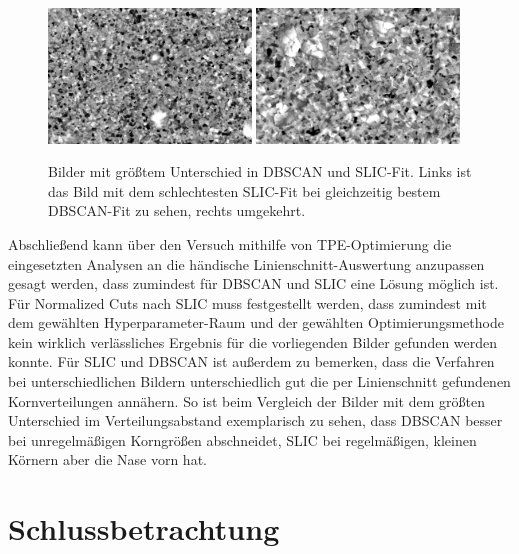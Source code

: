 \documentclass[
  12pt,
  openany]{book}
\begin{document}
\begin{figure}

{\centering \includegraphics[width=0.48\textwidth]{../imgs/slic_dbscan_0} \includegraphics[width=0.48\textwidth]{../imgs/slic_dbscan_1} 

}

\caption[Bilder mit größtem Unterschied in DBSCAN und SLIC-Fit.]{Bilder mit größtem Unterschied in DBSCAN und SLIC-Fit. Links ist das Bild mit dem schlechtesten SLIC-Fit bei gleichzeitig bestem DBSCAN-Fit zu sehen, rechts umgekehrt.}\label{fig:mostDistantImages}
\end{figure}

Abschließend kann über den Versuch mithilfe von TPE-Optimierung die eingesetzten Analysen an die händische Linienschnitt-Auswertung anzupassen gesagt werden, dass zumindest für DBSCAN und SLIC eine Lösung möglich ist. Für Normalized Cuts nach SLIC muss festgestellt werden, dass zumindest mit dem gewählten Hyperparameter-Raum und der gewählten Optimierungsmethode kein wirklich verlässliches Ergebnis für die vorliegenden Bilder gefunden werden konnte.
Für SLIC und DBSCAN ist außerdem zu bemerken, dass die Verfahren bei unterschiedlichen Bildern unterschiedlich gut die per Linienschnitt gefundenen Kornverteilungen annähern. So ist beim Vergleich der Bilder mit dem größten Unterschied im Verteilungsabstand exemplarisch zu sehen, dass DBSCAN besser bei unregelmäßigen Korngrößen abschneidet, SLIC bei regelmäßigen, kleinen Körnern aber die Nase vorn hat.

\hypertarget{schlussbetrachtung}{%
\chapter{Schlussbetrachtung}\label{schlussbetrachtung}}
\end{document}
